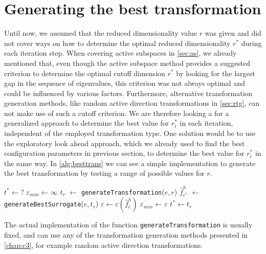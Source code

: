 \documentclass[
  a4paper,  %
  twoside,  %
  bibliography=totoc,
  headsepline,
  cleardoublepage=empty,
  parskip=half,
  draft=false
]{scrbook}
\begin{document}
\section{Generating the best transformation}
\label{sec:trans_gen}

Until now, we assumed that the reduced dimensionality value $r$ was given and did not cover ways on how to determine the optimal reduced dimensionality $r^\ast$ during each iteration step.
When covering active subspaces in \cref{sec:as}, we already mentioned that, even though the active subspace method provides a suggested criterion to determine the optimal cutoff dimension $r^\ast$ by looking for the largest gap in the sequence of eigenvalues, this criterion was not always optimal and could be influenced by various factors.
Furthermore, alternative transformation generation methods, like random active direction transformations in \cref{sec:rtg}, can not make use of such a cutoff criterion.
We are therefore looking a for a generalized approach to determine the best value for $r^\ast_i$ in each iteration, independent of the employed transformation type.
One solution would be to use the exploratory look ahead approach, which we already used to find the best configuration parameters in previous section, to determine the best value for $r^\ast_i$ in the same way.
In \cref{alg:besttrans} we can see a simple implementation to generate the best transformation by testing a range of possible values for $r$.

\begin{mdframed}[style=algstyle,frametitle={\textbf{function} \texttt{generateBestTransformation}{$(e, r_{\text{min}} ,r_{\text{max}})$}}]
\normalsize
\vspace{5.5mm}
\begin{algorithmic}[1]
    \State $t^\ast \gets ?$
    \State $\varepsilon_{min} \gets \infty$
      \State $t_r$ $\gets$ \texttt{generateTransformation}($e, r$)
      \State $\hat{f}_{c^\ast}^h$ $\gets$ \texttt{generateBestSurrogate}($e, t_r$)
    	\State $\varepsilon \gets \varepsilon(\hat{f}_c^h)$
    	  \State $\varepsilon_{min}\gets \varepsilon$
    	\State $t^\ast \gets t_r$
    	\EndIf
    \EndFor
    \State {}
\end{algorithmic}
\vspace{-1.5mm}
\delimit
	\label{alg:besttrans}
\end{mdframed}
%
The actual implementation of the function \texttt{generateTransformation} is usually fixed, and can use any of the transformation generation methods presented in \cref{chap:c3}, for example random active direction transformations.
\end{document}
